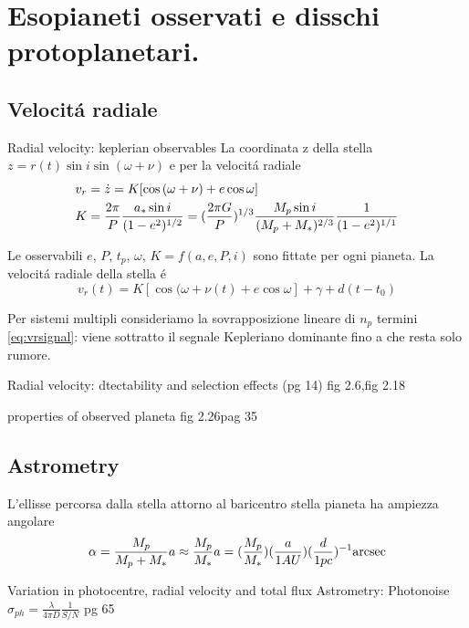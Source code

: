 \chapter{Esopianeti osservati e disschi protoplanetari.}

\section{Velocit\'a radiale}
\begin{workout}{Radial velocity: keplerian observables}
La coordinata z della stella $z=r(t)\sin{i}\sin{(\omega+\nu)}$ e per la velocit\'a radiale
\begin{align}
&v_r=\dot{z}=K[\cos{(\omega+\nu)}+e\cos{\omega}]\label{eq:vrsignal}\\
&K=\frac{2\pi}{P}\frac{a_*\sin{i}}{(1-e^2)\expy{1/2}}=(\frac{2\pi G}{P})\expy{1/3}\frac{M_p\sin{i}}{(M_p+M_*)\expy{2/3}}\frac{1}{(1-e^2)\expy{1/1}}
\end{align}

Le osservabili $e$, $P$, $t_p$, $\omega$, $K=f(a,e,P,i)$ sono fittate per ogni pianeta.
La velocit\'a radiale della stella \'e
\begin{equation}
v_r(t)=K[\cos{(\omega+\nu(t)}+e\cos{\omega}]+\gamma+d(t-t_0)
\end{equation}
\end{workout}
Per sistemi multipli consideriamo la sovrapposizione lineare di $n_p$ termini \eqref{eq:vrsignal}: viene sottratto il segnale Kepleriano dominante fino a che resta solo rumore.
\begin{workout}{Radial velocity: dtectability and selection effects (pg 14)}
fig 2.6,fig 2.18
\end{workout}
\begin{workout}{properties of observed planeta}
fig 2.26pag 35
\end{workout}
\section{Astrometry}
L'ellisse percorsa dalla stella attorno al baricentro stella pianeta ha ampiezza angolare
\begin{equation}
\alpha=\frac{M_p}{M_p+M_*}a\approx\frac{M_p}{M_*}a=(\frac{M_p}{M_*})(\frac{a}{1AU})(\frac{d}{1pc})\expy{-1}\si{\arcsec}
\end{equation}

\begin{workout}{Variation in photocentre, radial velocity and total flux}
Astrometry: Photonoise $\sigma_{ph}=\frac{\lambda}{4\pi D}\frac{1}{S/N}$
pg 65
\end{workout}

